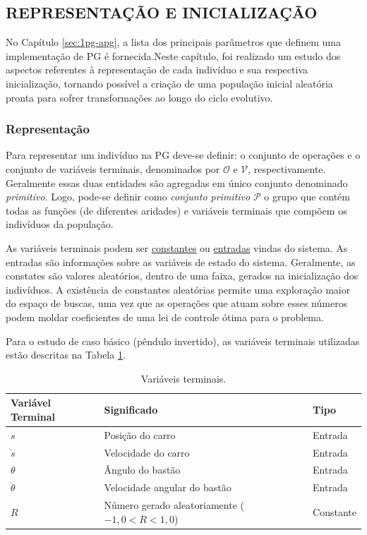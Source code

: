 \subsection{REPRESENTAÇÃO E INICIALIZAÇÃO}\label{ssec:3deap-represinic}

No Capítulo \ref{sec:1pg-apg}, a lista dos principais parâmetros que definem uma
implementação de PG é fornecida.\@ Neste capítulo, foi realizado um estudo dos aspectos referentes à representação de cada indivíduo e sua respectiva inicialização, tornando possível a criação de uma população inicial aleatória pronta para sofrer transformações ao longo do ciclo evolutivo.

\subsubsection{Representação}\label{sssec:3deap-representacao}

Para representar um indivíduo na PG deve-se definir: o conjunto de operações e o conjunto de variáveis terminais, denominados por $\mathcal{O}$ e $\mathcal{V}$, respectivamente. Geralmente essas duas entidades são agregadas em único conjunto denominado \textit{primitivo}. Logo, pode-se definir como \textit{conjunto primitivo} $\mathcal{P}$ o grupo que contém todas as funções (de diferentes aridades) e variáveis terminais que compõem os indivíduos da população.

As variáveis terminais podem ser \underline{constantes} ou \underline{entradas} vindas do sistema. As entradas são informações sobre as variáveis de estado do sistema. Geralmente, as constates são valores aleatórios, dentro de uma faixa, gerados na inicialização dos indivíduos. A existência de constantes aleatórias permite uma exploração maior do espaço de buscas, uma vez que as operações que atuam sobre esses números podem moldar coeficientes de uma lei de controle ótima para o problema.

Para o estudo de caso básico (pêndulo invertido), as variáveis terminais utilizadas estão descritas na Tabela \ref{tab:3deap-varterm}.

\begin{table}[H]
	\centering
	\begin{tabular}{l|l|l} \toprule
		{Variável Terminal} & {Significado} & {Tipo}\\ \midrule
		{$s$} & {Posição do carro} & {Entrada}\\
		{$\dot{s}$} & {Velocidade do carro} & {Entrada}\\
		{$\theta$} & {Ângulo do bastão} & {Entrada}\\
		{$\dot{\theta}$} & {Velocidade angular do bastão} & {Entrada}\\
		{$R$} & {Número gerado aleatoriamente ($-1,0<R<1,0$)} & {Constante}
		\\ \bottomrule
	\end{tabular}
	\caption{Variáveis terminais.}\label{tab:3deap-varterm}
\end{table}

